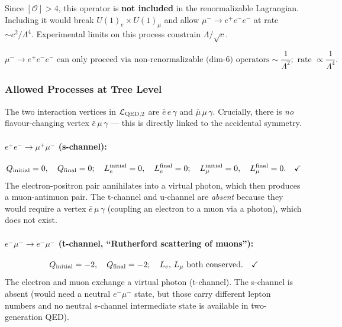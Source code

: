 \documentclass[../main.tex]{subfiles}
\begin{document}
Since $[\mathcal{O}]>4$, this operator is \textbf{not included} in the renormalizable Lagrangian.  Including it would break $U(1)_e\times U(1)_\mu$ and allow $\mu^-\to e^+e^-e^-$ at rate $\sim c^2/\Lambda^4$.  Experimental limits on this process constrain $\Lambda/\sqrt{c}$.

\begin{equation}
  \boxed{
  \mu^-\to e^+e^-e^-\text{ can only proceed via non-renormalizable (dim-6) operators}
  \sim \frac{1}{\Lambda^2};
  \text{ rate }\propto \frac{1}{\Lambda^4}.}
  \label{eq:lec12:lfvrate}
\end{equation}

\subsubsection*{Allowed Processes at Tree Level}

The two interaction vertices in $\mathcal{L}_{\mathrm{QED},2}$ are $\bar{e}\,e\,\gamma$ and $\bar{\mu}\,\mu\,\gamma$. Crucially, there is \emph{no} flavour-changing vertex $\bar{e}\,\mu\,\gamma$ — this is directly linked to the accidental symmetry.

\paragraph{$e^+e^-\to\mu^+\mu^-$ (s-channel):}
\begin{align*}
  Q_{\rm initial} = 0, \quad Q_{\rm final} = 0; \quad
  L_e^{\rm initial} = 0, \quad L_e^{\rm final} = 0; \quad
  L_\mu^{\rm initial} = 0, \quad L_\mu^{\rm final} = 0. \quad\checkmark
\end{align*}
The electron-positron pair annihilates into a virtual photon, which then produces a muon-antimuon pair.  The t-channel and u-channel are \emph{absent} because they would require a vertex $\bar{e}\,\mu\,\gamma$ (coupling an electron to a muon via a photon), which does not exist.

\paragraph{$e^-\mu^-\to e^-\mu^-$ (t-channel, ``Rutherford scattering of muons''):}
\begin{align*}
  Q_{\rm initial} = -2, \quad Q_{\rm final} = -2; \quad
  L_e,\,L_\mu\text{ both conserved}. \quad\checkmark
\end{align*}
The electron and muon exchange a virtual photon (t-channel).  The s-channel is absent (would need a neutral $e^-\mu^-$ state, but those carry different lepton numbers and no neutral s-channel intermediate state is available in two-generation QED).
\end{document}
